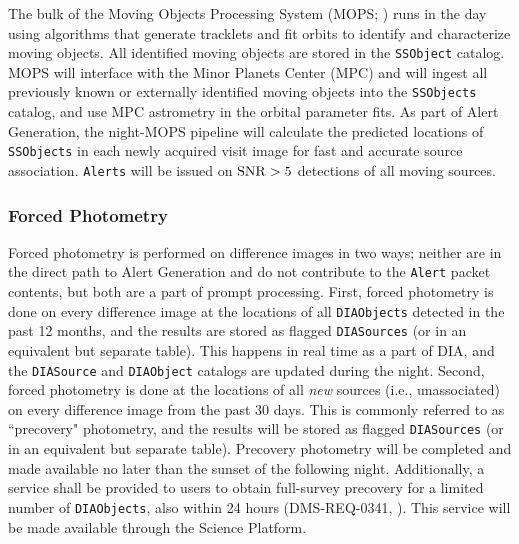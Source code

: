 The bulk of the Moving Objects Processing System (MOPS; ) runs in the day using algorithms that generate tracklets and fit orbits to identify and characterize moving objects. All identified moving objects are stored in the {\tt SSObject} catalog. MOPS will interface with the Minor Planets Center (MPC) and will ingest all previously known or externally identified moving objects into the {\tt SSObjects} catalog, and use MPC astrometry in the orbital parameter fits. As part of Alert Generation, the night-MOPS pipeline will calculate the predicted locations of {\tt SSObjects} in each newly acquired visit image for fast and accurate source association. {\tt Alerts} will be issued on ${\rm SNR} > 5$ detections of all moving sources.

\subsubsection{Forced Photometry}

Forced photometry is performed on difference images in two ways; neither are in the direct path to Alert Generation and do not contribute to the {\tt Alert} packet contents, but both are a part of prompt processing. First, forced photometry is done on every difference image at the locations of all {\tt DIAObjects} detected in the past 12 months, and the results are stored as flagged {\tt DIASources} (or in an equivalent but separate table). This happens in real time as a part of DIA, and the {\tt DIASource} and {\tt DIAObject} catalogs are updated during the night. Second, forced photometry is done at the locations of all {\em new} sources (i.e., unassociated) on every difference image from the past 30 days. This is commonly referred to as ``precovery" photometry, and the results will be stored as flagged {\tt DIASources} (or in an equivalent but separate table). Precovery photometry will be completed and made available no later than the sunset of the following night.
Additionally, a service shall be provided to users to obtain full-survey precovery for a limited number of {\tt DIAObjects}, also within 24 hours (DMS-REQ-0341, ). This service will be made available through the Science Platform.


